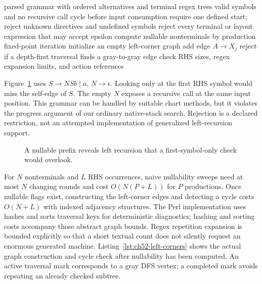 \begin{algorithm}[htbp]
\caption{Validate the progress assumptions of the backtracking generator.}
\label{alg:ch52-validate}
\begin{pseudocode}
\Require parsed grammar with ordered alternatives and terminal regex trees
\Ensure valid symbols and no recursive call cycle before input consumption
\State require one defined start; reject unknown directives and undefined symbols
\State reject every terminal or layout expression that may accept epsilon
\State compute nullable nonterminals by production fixed-point iteration
\State initialize an empty left-corner graph
     \State \Break \EndIf
    \State add edge $A\to X_j$
     \State \Break \EndIf
  \EndFor
\EndFor
\State reject if a depth-first traversal finds a gray-to-gray edge
\State check RHS sizes, regex expansion limits, and action references
\end{pseudocode}
\end{algorithm}

Figure~\ref{fig:ch52-cycle} uses $S\to N S b\mid a$, $N\to\epsilon$.
Looking only at the first RHS symbol would miss the self-edge of $S$.
The empty $N$ exposes a recursive call at the same input position.
This grammar can be handled by suitable chart methods, but it violates the progress argument of our ordinary native-stack search.
Rejection is a declared restriction, not an attempted implementation of generalized left-recursion support.

\begin{figure}[htbp]
\centering
{}
\caption{A nullable prefix reveals left recursion that a first-symbol-only check would overlook.}
\label{fig:ch52-cycle}
\end{figure}

For $N$ nonterminals and $L$ RHS occurrences, naive nullability sweeps need at most $N$ changing rounds and cost $O(N(P+L))$ for $P$ productions.
Once nullable flags exist, constructing the left-corner edges and detecting a cycle costs $O(N+L)$ with indexed adjacency structures.
The Perl implementation uses hashes and sorts traversal keys for deterministic diagnostics; hashing and sorting costs accompany those abstract graph bounds.
Regex repetition expansion is bounded explicitly so that a short textual count does not silently request an enormous generated machine.
Listing~\ref{lst:ch52-left-corners} shows the actual graph construction and cycle check after nullability has been computed.
An active traversal mark corresponds to a gray DFS vertex; a completed mark avoids repeating an already checked subtree.

